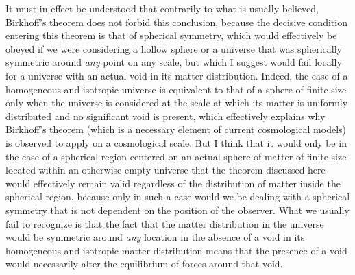 \documentclass[notitlepage,12pt]{report}
\begin{document}
It must in effect be understood that contrarily to what is usually believed, Birkhoff's theorem does not forbid this conclusion, because the decisive condition entering this theorem is that of spherical symmetry, which would effectively be obeyed if we were considering a hollow sphere or a universe that was spherically symmetric around \textit{any} point on any scale, but which I suggest would fail locally for a universe with an actual void in its matter distribution. Indeed, the case of a homogeneous and isotropic universe is equivalent to that of a sphere of finite size only when the universe is considered at the scale at which its matter is uniformly distributed and no significant void is present, which effectively explains why Birkhoff's theorem (which is a necessary element of current cosmological models) is observed to apply on a cosmological scale. But I think that it would only be in the case of a spherical region centered on an actual sphere of matter of finite size located within an otherwise empty universe that the theorem discussed here would effectively remain valid regardless of the distribution of matter inside the spherical region, because only in such a case would we be dealing with a spherical symmetry that is not dependent on the position of the observer. What we usually fail to recognize is that the fact that the matter distribution in the universe would be symmetric around \textit{any} location in the absence of a void in its homogeneous and isotropic matter distribution means that the presence of a void would necessarily alter the equilibrium of forces around that void.
\end{document}
